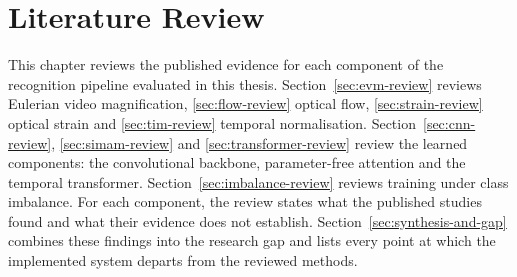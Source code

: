 %
%

\chapter{Literature Review}
\label{ch:literature}

This chapter reviews the published evidence for each component of the recognition pipeline evaluated in this thesis. Section~\ref{sec:evm-review} reviews Eulerian video magnification, \autoref{sec:flow-review} optical flow, \autoref{sec:strain-review} optical strain and \autoref{sec:tim-review} temporal normalisation. Section~\ref{sec:cnn-review}, \autoref{sec:simam-review} and \autoref{sec:transformer-review} review the learned components: the convolutional backbone, parameter-free attention and the temporal transformer. Section~\ref{sec:imbalance-review} reviews training under class imbalance. For each component, the review states what the published studies found and what their evidence does not establish. Section~\ref{sec:synthesis-and-gap} combines these findings into the research gap and lists every point at which the implemented system departs from the reviewed methods.

